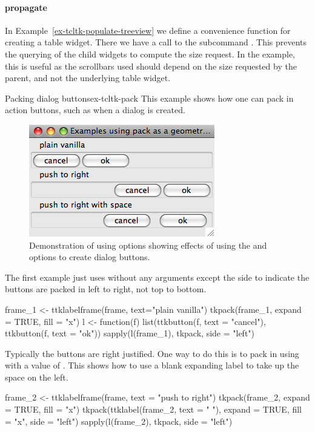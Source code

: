 %


\paragraph{propagate}
In Example~\ref{ex-tcltk-populate-treeview} we define a convenience
function for creating a table widget. There we have a call to the
subcommand .  This prevents the querying
of the child widgets to compute the size request. In the example, this
is useful as the scrollbars used should depend on the size requested
by the parent, and not the underlying table widget.


\begin{example}{Packing dialog buttons}{ex-tcltk-pack}
This example shows how one can pack in action buttons, such as when a
dialog is created.

\begin{figure}
  \centering
  \includegraphics[width=.5\textwidth]{fig-tcltk-pack-buttons.png}
  \caption{Demonstration of using  options showing
    effects of using the 
    and  options to create
    dialog buttons.}
  \label{fig:tcltk-pack-buttons}
\end{figure}


The first example just uses  without any arguments except
the side to indicate the buttons are packed in left to right, not top
to bottom.
\begin{Schunk}
\begin{Sinput}
 frame_1 <- ttklabelframe(frame, text="plain vanilla")
 tkpack(frame_1, expand = TRUE, fill = "x")
 l <- function(f) 
   list(ttkbutton(f, text = "cancel"), ttkbutton(f, text = "ok"))
 sapply(l(frame_1), tkpack, side = "left")
\end{Sinput}
\end{Schunk}

Typically the buttons are right justified. One way to do this is to
pack in using  with a value of . This shows
how to use a blank expanding label to take up the space on the left.
\begin{Schunk}
\begin{Sinput}
 frame_2 <- ttklabelframe(frame, text = "push to right")
 tkpack(frame_2, expand = TRUE, fill = "x")
 tkpack(ttklabel(frame_2, text = " "), 
        expand = TRUE, fill = "x", side = "left")
 sapply(l(frame_2), tkpack, side = "left")
\end{Sinput}
\end{Schunk}


\end{example}
